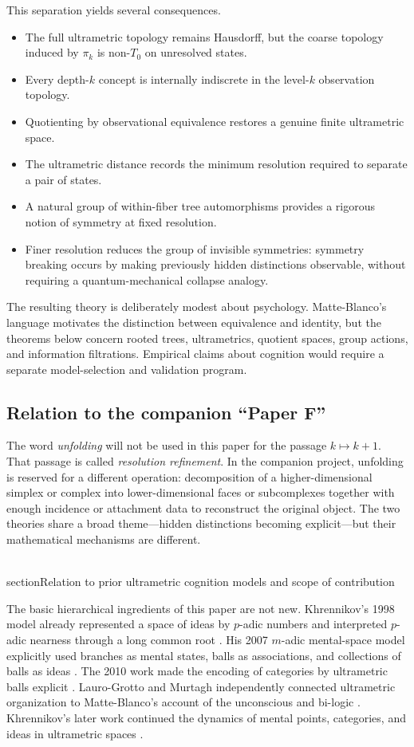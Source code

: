 \documentclass[11pt]{article}
\theoremstyle{definition}
\theoremstyle{remark}
\begin{document}
This separation yields several consequences.
\begin{itemize}
\item The full ultrametric topology remains Hausdorff, but the coarse topology induced by $\pi_k$ is non-$T_0$ on unresolved states.
\item Every depth-$k$ concept is internally indiscrete in the level-$k$ observation topology.
\item Quotienting by observational equivalence restores a genuine finite ultrametric space.
\item The ultrametric distance records the minimum resolution required to separate a pair of states.
\item A natural group of within-fiber tree automorphisms provides a rigorous notion of symmetry at fixed resolution.
\item Finer resolution reduces the group of invisible symmetries: symmetry breaking occurs by making previously hidden distinctions observable, without requiring a quantum-mechanical collapse analogy.
\end{itemize}

The resulting theory is deliberately modest about psychology.  Matte-Blanco's language motivates the distinction between equivalence and identity, but the theorems below concern rooted trees, ultrametrics, quotient spaces, group actions, and information filtrations.  Empirical claims about cognition would require a separate model-selection and validation program.

\subsection*{Relation to the companion ``Paper F''}
The word \emph{unfolding} will not be used in this paper for the passage $k\mapsto k+1$.  That passage is called \emph{resolution refinement}.  In the companion project, unfolding is reserved for a different operation: decomposition of a higher-dimensional simplex or complex into lower-dimensional faces or subcomplexes together with enough incidence or attachment data to reconstruct the original object.  The two theories share a broad theme---hidden distinctions becoming explicit---but their mathematical mechanisms are different.

\\section{Relation to prior ultrametric cognition models and scope of contribution}

The basic hierarchical ingredients of this paper are not new.  Khrennikov's 1998 model already represented a space of ideas by $p$-adic numbers and interpreted $p$-adic nearness through a long common root \cite{Khrennikov1998}.  His 2007 $m$-adic mental-space model explicitly used branches as mental states, balls as associations, and collections of balls as ideas \cite{Khrennikov2007}.  The 2010 work made the encoding of categories by ultrametric balls explicit \cite{Khrennikov2010}.  Lauro-Grotto and Murtagh independently connected ultrametric organization to Matte-Blanco's account of the unconscious and bi-logic \cite{LauroGrotto2008,Murtagh2012,Murtagh2014}.  Khrennikov's later work continued the dynamics of mental points, categories, and ideas in ultrametric spaces \cite{Khrennikov2014}.
\end{document}
